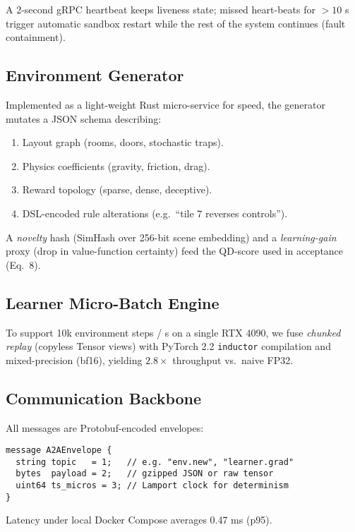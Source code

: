 A 2-second gRPC heartbeat keeps liveness state; missed heart-beats for
$>10$ s trigger automatic sandbox restart while the rest of the system
continues (fault containment).

\subsection{Environment Generator}

Implemented as a light-weight Rust micro-service for speed, the generator
mutates a JSON schema describing:

\begin{enumerate}[label=\alph*)]
  \item Layout graph (rooms, doors, stochastic traps).
  \item Physics coefficients (gravity, friction, drag).
  \item Reward topology (sparse, dense, deceptive).
  \item DSL-encoded rule alterations (e.g.\ ``tile 7 reverses controls'').
\end{enumerate}

A \emph{novelty} hash (SimHash over 256-bit scene embedding) and a
\emph{learning-gain} proxy (drop in value-function certainty) feed the
QD-score used in acceptance (Eq.~8).

\subsection{Learner Micro-Batch Engine}

To support 10k environment steps / s on a single RTX 4090, we fuse
\emph{chunked replay} (copyless Tensor views) with PyTorch 2.2
\texttt{inductor} compilation and mixed-precision (bf16), yielding
$2.8\times$ throughput vs.\ naive FP32.

\subsection{Communication Backbone}

All messages are Protobuf-encoded envelopes:

\begin{verbatim}
message A2AEnvelope {
  string topic   = 1;   // e.g. "env.new", "learner.grad"
  bytes  payload = 2;   // gzipped JSON or raw tensor
  uint64 ts_micros = 3; // Lamport clock for determinism
}
\end{verbatim}

Latency under local Docker Compose averages 0.47 ms (p95).

